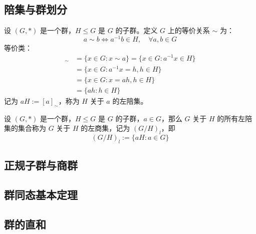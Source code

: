 \vspace{1em}
\subsection{陪集与群划分}
\begin{definition}
    设 $(G, *)$ 是一个群，$H \le G$ 是 $G$ 的子群。定义 $G$ 上的等价关系 $\sim$ 为：
    \[
        a \sim b \iff a^{-1}b \in H, \quad \forall a, b \in G
    \]
    等价类：
    \begin{align*}
        [a]_{\sim} &= \{x\in G:x\sim a\} = \{x\in G:a^{-1}x\in H\}\\
        &=\{x\in G:a^{-1}x = h,h\in H\}\\
        &=\{x\in G:x=ah,h\in H\}\\
        &=\{ah:h\in H\}
    \end{align*}
    记为 $aH := [a]_{\sim}$，称为 $H$ 关于 $a$ 的左陪集。
\end{definition}

\begin{definition}
    设 $(G, *)$ 是一个群，$H \le G$ 是 $G$ 的子群，$a\in G$，那么 $G$ 关于 $H$ 的所有左陪集的集合称为 $G$ 关于 $H$ 的左商集，记为 $(G/H)_l$，即
    \[
        (G/H)_l := \{aH:a\in G\}
    \]
\end{definition}

\vspace{1em}
\subsection{正规子群与商群}

\vspace{1em}
\subsection{群同态基本定理}

\vspace{1em}
\subsection{群的直和}

\newpage